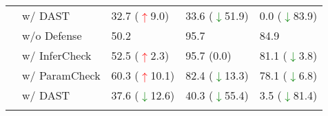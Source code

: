 \begin{table}[b]
{\begin{tabular}{cl|lll}
                                  & w/ DAST                        & 32.7 (\textcolor{red}{$\uparrow$}9.0)              & 33.6 (\textcolor{green}{$\downarrow$}51.9)            & 0.0 (\textcolor{green}{$\downarrow$}83.9)                    \\
                                  \arrayrulecolor{gray!50}\hline
\multirow{4}{*}{\textbf{AutoGen}}          & \cellcolor{gray!20}w/o Defense                            & \cellcolor{gray!20}50.2                    & \cellcolor{gray!20}95.7                    & \cellcolor{gray!20}84.9                           \\
                                  & w/ InferCheck                  & 52.5 (\textcolor{red}{$\uparrow$}2.3)              & 95.7 (0.0)              & 81.1 (\textcolor{green}{$\downarrow$}3.8)                    \\
                                  & w/ ParamCheck                  & 60.3 (\textcolor{red}{$\uparrow$}10.1)             & 82.4 (\textcolor{green}{$\downarrow$}13.3)            & 78.1 (\textcolor{green}{$\downarrow$}6.8)                    \\
                                  & w/ DAST                        & 37.6 (\textcolor{green}{$\downarrow$}12.6)            & 40.3 (\textcolor{green}{$\downarrow$}55.4)            & 3.5 (\textcolor{green}{$\downarrow$}81.4)    \\
                                  \arrayrulecolor{black}\bottomrule

\end{tabular}}
\vspace{-0.3cm}
\label{tab:attack_defense}
\end{table}